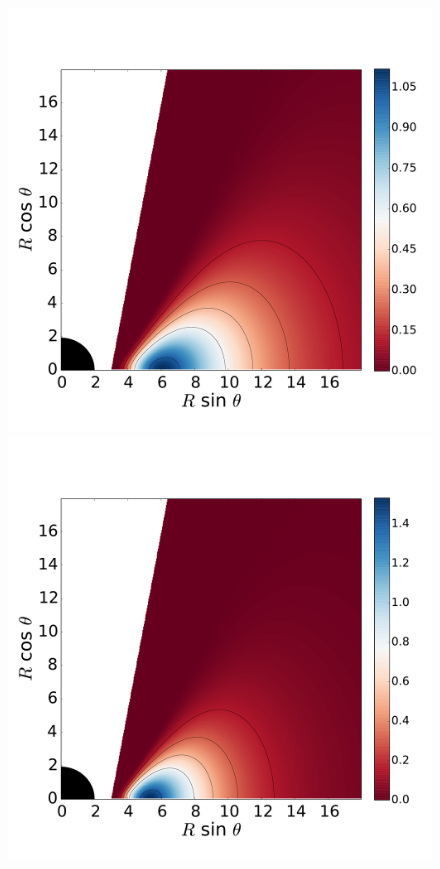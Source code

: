 \documentclass[twocolumn,aps,showpacs,showkeys,prd,superscriptaddress,byrevtex, amsmath]{revtex4-1}
\begin{document}
\begin{figure}
\hspace{-0.3cm}
\includegraphics[scale=0.14]{figures/fig10_05_1.pdf}
\hspace{-0.2cm}
\includegraphics[scale=0.14]{figures/fig10_05__10.pdf}

\end{figure}
\end{document}
